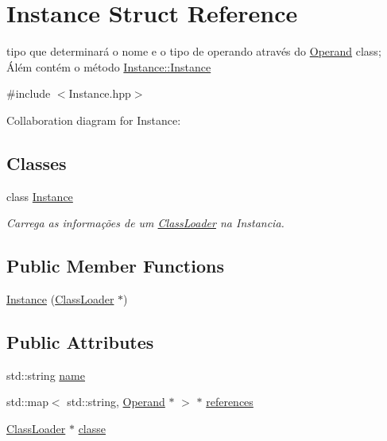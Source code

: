 \hypertarget{struct_instance}{}\section{Instance Struct Reference}
\label{struct_instance}


tipo que determinará o nome e o tipo de operando através do \hyperlink{struct_operand}{Operand} class; Álém contém o método \hyperlink{class_instance_1_1_instance}{Instance\+::\+Instance}  




{\ttfamily \#include $<$Instance.\+hpp$>$}



Collaboration diagram for Instance\+:
\subsection*{Classes}
\begin{DoxyCompactItemize}
\item 
class \hyperlink{class_instance_1_1_instance}{Instance}
\begin{DoxyCompactList}\small\item\em Carrega as informações de um \hyperlink{class_class_loader}{Class\+Loader} na Instancia. \end{DoxyCompactList}\end{DoxyCompactItemize}
\subsection*{Public Member Functions}
\begin{DoxyCompactItemize}
\item 
\hyperlink{struct_instance_aca86b4cbc971ace708021f8ef2c6ce43}{Instance} (\hyperlink{class_class_loader}{Class\+Loader} $\ast$)
\end{DoxyCompactItemize}
\subsection*{Public Attributes}
\begin{DoxyCompactItemize}
\item 
std\+::string \hyperlink{struct_instance_a80e29939a8dac12ad5d8008f3df241af}{name}
\item 
std\+::map$<$ std\+::string, \hyperlink{struct_operand}{Operand} $\ast$ $>$ $\ast$ \hyperlink{struct_instance_a3262e6460c3b4fa873a3a439e77fdf7e}{references}
\item 
\hyperlink{class_class_loader}{Class\+Loader} $\ast$ \hyperlink{struct_instance_a7247d0aa8380ec112069ad6c78a11bd2}{classe}
\end{DoxyCompactItemize}


